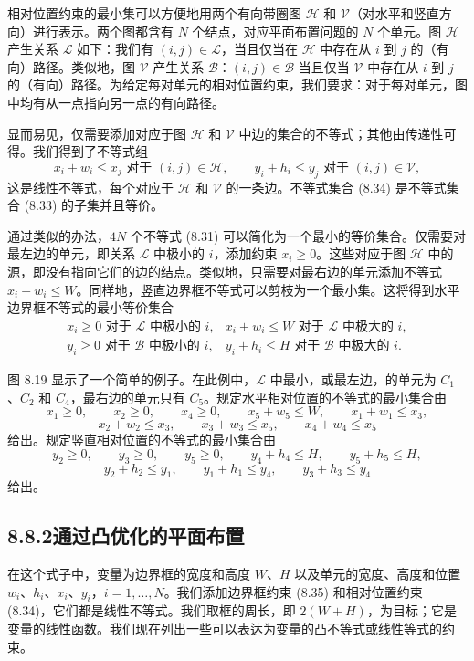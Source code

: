 \documentclass[UTF8,12pt,a4paper,fontset=fandol]{ctexart}
\begin{document}
相对位置约束的最小集可以方便地用两个有向带圈图 $\mathcal H$ 和 $\mathcal V$（对水平和竖直方向）进行表示。两个图都含有 $N$ 个结点，对应平面布置问题的 $N$ 个单元。图 $\mathcal H$ 产生关系 $\mathcal L$ 如下：我们有 $(i,j)\in\mathcal L$，当且仅当在 $\mathcal H$ 中存在从 $i$ 到 $j$ 的（有向）路径。类似地，图 $\mathcal V$ 产生关系 $\mathcal B$：$(i,j)\in\mathcal B$ 当且仅当 $\mathcal V$ 中存在从 $i$ 到 $j$ 的（有向）路径。为给定每对单元的相对位置约束，我们要求：对于每对单元，图中均有从一点指向另一点的有向路径。

显而易见，仅需要添加对应于图 $\mathcal H$ 和 $\mathcal V$ 中边的集合的不等式；其他由传递性可得。我们得到了不等式组
\[
x_i+w_i\leq x_j \mbox{ 对于 } (i,j)\in\mathcal H,\qquad
y_i+h_i\leq y_j \mbox{ 对于 } (i,j)\in\mathcal V,
\tag{8.34}
\]
这是线性不等式，每个对应于 $\mathcal H$ 和 $\mathcal V$ 的一条边。不等式集合 (8.34) 是不等式集合 (8.33) 的子集并且等价。

通过类似的办法，$4N$ 个不等式 (8.31) 可以简化为一个最小的等价集合。仅需要对最左边的单元，即关系 $\mathcal L$ 中极小的 $i$，添加约束 $x_i\geq 0$。这些对应于图 $\mathcal H$ 中的源，即没有指向它们的边的结点。类似地，只需要对最右边的单元添加不等式 $x_i+w_i\leq W$。同样地，竖直边界框不等式可以剪枝为一个最小集。这将得到水平边界框不等式的最小等价集合
\[
\begin{array}{ll}
x_i\geq 0 \mbox{ 对于 } \mathcal L \mbox{ 中极小的 } i, & x_i+w_i\leq W \mbox{ 对于 } \mathcal L \mbox{ 中极大的 } i,\\
y_i\geq 0 \mbox{ 对于 } \mathcal B \mbox{ 中极小的 } i, & y_i+h_i\leq H \mbox{ 对于 } \mathcal B \mbox{ 中极大的 } i.
\end{array}
\tag{8.35}
\]

图 8.19 显示了一个简单的例子。在此例中，$\mathcal L$ 中最小，或最左边，的单元为 $C_1$、$C_2$ 和 $C_4$，最右边的单元只有 $C_5$。规定水平相对位置的不等式的最小集合由
\[
x_1\geq 0,\qquad x_2\geq 0,\qquad x_4\geq 0,\qquad x_5+w_5\leq W,\qquad x_1+w_1\leq x_3,
\]
\[
x_2+w_2\leq x_3,\qquad x_3+w_3\leq x_5,\qquad x_4+w_4\leq x_5
\]
给出。规定竖直相对位置的不等式的最小集合由
\[
y_2\geq 0,\qquad y_3\geq 0,\qquad y_5\geq 0,\qquad y_4+h_4\leq H,\qquad y_5+h_5\leq H,
\]
\[
y_2+h_2\leq y_1,\qquad y_1+h_1\leq y_4,\qquad y_3+h_3\leq y_4
\]
给出。

\subsection*{8.8.2\quad 通过凸优化的平面布置}

在这个式子中，变量为边界框的宽度和高度 $W$、$H$ 以及单元的宽度、高度和位置 $w_i$、$h_i$、$x_i$、$y_i$，$i=1,\ldots,N$。我们添加边界框约束 (8.35) 和相对位置约束 (8.34)，它们都是线性不等式。我们取框的周长，即 $2(W+H)$，为目标；它是变量的线性函数。我们现在列出一些可以表达为变量的凸不等式或线性等式的约束。
\end{document}
